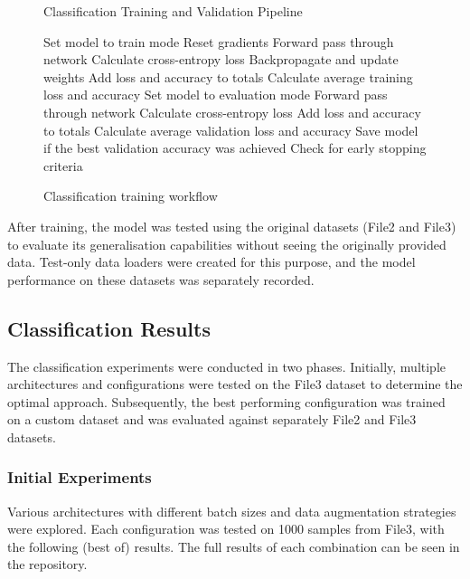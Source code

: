 \documentclass[conference]{IEEEtran}
\begin{document}
\begin{figure}[H]
\begin{algorithm}[H]
\caption{Classification Training and Validation Pipeline}
\begin{algorithmic}[1]
    \STATE Set model to train mode
        \STATE Reset gradients
        \STATE Forward pass through network
        \STATE Calculate cross-entropy loss
        \STATE Backpropagate and update weights
        \STATE Add loss and accuracy to totals
    \ENDFOR
    \STATE Calculate average training loss and accuracy
    \STATE Set model to evaluation mode
        \STATE Forward pass through network
        \STATE Calculate cross-entropy loss
        \STATE Add loss and accuracy to totals
    \ENDFOR
    \STATE Calculate average validation loss and accuracy
    \STATE Save model if the best validation accuracy was achieved
    \STATE Check for early stopping criteria
\ENDFOR
\end{algorithmic}
\end{algorithm}
\caption{Classification training workflow}
\end{figure}

After training, the model was tested using the original datasets (File2 and File3) to evaluate its
generalisation capabilities without seeing the originally provided data. Test-only data loaders were
created for this purpose, and the model performance on these datasets was separately recorded.

\subsection{Classification Results}

The classification experiments were conducted in two phases. Initially, multiple architectures and configurations were tested on the
File3 dataset to determine the optimal approach. Subsequently, the best performing configuration was trained on a custom dataset and
was evaluated against separately File2 and File3 datasets.

\subsubsection{Initial Experiments}

Various architectures with different batch sizes and data augmentation strategies were explored. Each configuration was tested on
1000 samples from File3, with the following (best of) results. The full results of each combination can be seen in the repository.
\end{document}
